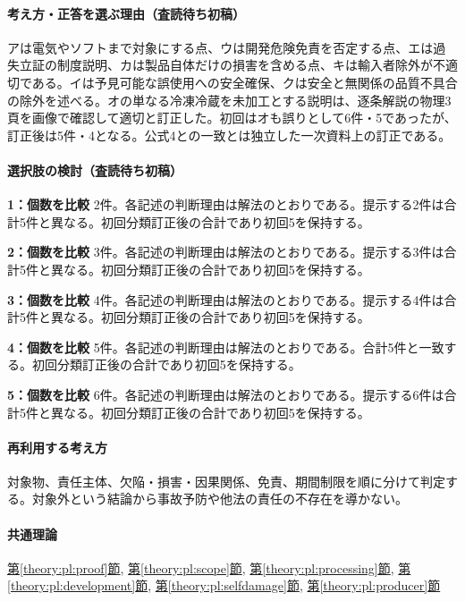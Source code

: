 \paragraph{考え方・正答を選ぶ理由（査読待ち初稿）} アは電気やソフトまで対象にする点、ウは開発危険免責を否定する点、エは過失立証の制度説明、カは製品自体だけの損害を含める点、キは輸入者除外が不適切である。イは予見可能な誤使用への安全確保、クは安全と無関係の品質不具合の除外を述べる。オの単なる冷凍冷蔵を未加工とする説明は、逐条解説の物理3頁を画像で確認して適切と訂正した。初回はオも誤りとして6件・5であったが、訂正後は5件・4となる。公式4との一致とは独立した一次資料上の訂正である。

\paragraph{選択肢の検討（査読待ち初稿）}\mbox{}\par

\noindent\textbf{1：個数を比較} 2件。各記述の判断理由は解法のとおりである。提示する2件は合計5件と異なる。初回分類訂正後の合計であり初回5を保持する。\par

\noindent\textbf{2：個数を比較} 3件。各記述の判断理由は解法のとおりである。提示する3件は合計5件と異なる。初回分類訂正後の合計であり初回5を保持する。\par

\noindent\textbf{3：個数を比較} 4件。各記述の判断理由は解法のとおりである。提示する4件は合計5件と異なる。初回分類訂正後の合計であり初回5を保持する。\par

\noindent\textbf{4：個数を比較} 5件。各記述の判断理由は解法のとおりである。合計5件と一致する。初回分類訂正後の合計であり初回5を保持する。\par

\noindent\textbf{5：個数を比較} 6件。各記述の判断理由は解法のとおりである。提示する6件は合計5件と異なる。初回分類訂正後の合計であり初回5を保持する。\par

\paragraph{再利用する考え方} 対象物、責任主体、欠陥・損害・因果関係、免責、期間制限を順に分けて判定する。対象外という結論から事故予防や他法の責任の不存在を導かない。

\paragraph{共通理論} \hyperref[theory:pl:proof]{第\ref*{theory:pl:proof}節}, \hyperref[theory:pl:scope]{第\ref*{theory:pl:scope}節}, \hyperref[theory:pl:processing]{第\ref*{theory:pl:processing}節}, \hyperref[theory:pl:development]{第\ref*{theory:pl:development}節}, \hyperref[theory:pl:selfdamage]{第\ref*{theory:pl:selfdamage}節}, \hyperref[theory:pl:producer]{第\ref*{theory:pl:producer}節}

